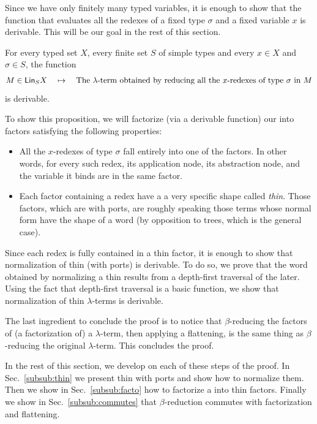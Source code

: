   Since we have only finitely many typed variables, it is enough to show that the function that evaluates all the redexes of a fixed type $\sigma$ and a fixed variable $x$ is derivable. This will be our goal in the rest of this section.

\begin{proposition}\label{thm:evalOneType}
 For every typed set $X$, every finite set $S$ of simple types and every $x\in X$ and $\sigma\in S$, the function 
    \begin{align*}
        M \in  \mathsf{Lin}_{S} X \quad \mapsto \quad  \text{The $\lambda$-term obtained by reducing all the $x$-redexes of type $\sigma$ in $M$} 
    \end{align*}
    is derivable.
\end{proposition}

To show this proposition, we will factorize (via a derivable function) our \lambdaterms into factors satisfying the following properties:
\begin{itemize}
\item All the $x$-redexes of type $\sigma$ fall entirely into one of the factors. In other words, for every such redex, its application node, its abstraction node, and the variable it binds are in the same factor.
\item Each factor containing a redex have a a very specific shape called \emph{thin}. Those factors, which are \lambdaterms with ports, are roughly speaking those terms whose normal form have the shape of a word (by opposition to trees, which is the general case).
\end{itemize}
Since each redex is fully contained in a thin factor, it is enough to show that normalization of thin \lambdaterms (with ports) is derivable. To do so, we prove that the word obtained by normalizing a thin \lambdaterm results from a depth-first traversal of the later. Using the fact that depth-first traversal is a basic function, we show that normalization of thin $\lambda$-terms is derivable.
 
 The last ingredient to conclude the proof is to notice that $\beta$-reducing the factors of (a factorization of) a $\lambda$-term, then applying a flattening, is the same thing as $\beta$-reducing the original $\lambda$-term. This concludes the proof. 
 
 In the rest of this section, we develop on each of these steps of the proof.  In Sec.~\ref{subsub:thin} we present thin \lambdaterms with ports and show how to normalize them. Then we show in Sec.~\ref{subsub:facto} how to factorize a \lambdaterm into thin factors. Finally we show in Sec.~\ref{subsub:commutes} that $\beta$-reduction commutes with factorization and flattening. 
 

